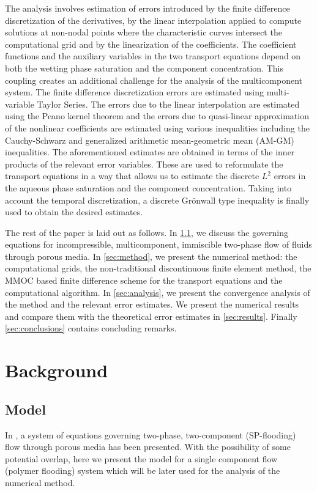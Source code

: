 \documentclass[11pt]{article}
\begin{document}
The analysis involves estimation of errors introduced by the finite difference discretization of the derivatives, by the linear interpolation applied to compute solutions at non-nodal points where the characteristic curves intersect the computational grid and by the linearization of the coefficients. The coefficient functions and the auxiliary variables in the two transport equations depend on both the wetting phase saturation and the component concentration. This coupling creates an additional challenge for the analysis of the multicomponent system. The finite difference discretization errors are estimated using multi-variable Taylor Series. The errors due to the linear interpolation are estimated using the Peano kernel theorem \cite{DR1982} and the errors due to quasi-linear approximation of the nonlinear coefficients are estimated using various inequalities including the Cauchy-Schwarz and generalized arithmetic mean-geometric mean (AM-GM) inequalities. The aforementioned estimates are obtained in terms of the inner products of the relevant error variables. These are used to reformulate the transport equations in a way that allows us to estimate the discrete $L^2$ errors in the aqueous phase saturation and the component concentration. Taking into account the temporal discretization, a discrete Gr\"{o}nwall type inequality is finally used to obtain the desired estimates. 

The rest of the paper is laid out as follows. In \cref{sec:problem}, we discuss the governing equations for incompressible, multicomponent, immiscible two-phase flow of fluids through porous media. In \cref{sec:method}, we present the numerical method: the computational grids, the non-traditional discontinuous finite element method, the MMOC based finite difference scheme for the transport equations and the computational algorithm. In \cref{sec:analysis}, we present the convergence analysis of the method and the relevant error estimates. We present the numerical results and compare them with the theoretical error estimates in \cref{sec:results}. Finally \cref{sec:conclusions} contains concluding remarks.



\section{Background}
\subsection{Model}\label{sec:problem}
In \cite{DD2017}, a system of equations governing two-phase, two-component (SP-flooding) flow through porous media has been presented. With the possibility of some potential overlap, here we present the model for a single component flow (polymer flooding) system which will be later used for the analysis of the numerical method. 
\end{document}
